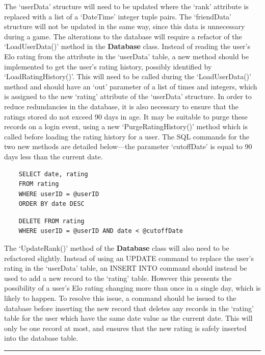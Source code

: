 \documentclass{article}
\begin{document}
 The `userData' structure will need to be updated where the `rank' attribute is replaced with a list of a `DateTime' integer tuple pairs. The `friendData' structure will not be updated in the same way, since this data is unnecessary during a game. The alterations to the database will require a refactor of the `LoadUserData()' method in the \textbf{Database} class. Instead of reading the user's Elo rating from the attribute in the `userData' table, a new method should be implemented to get the user's rating history, possibly identified by `LoadRatingHistory()'. This will need to be called during the `LoadUserData()' method and should have an `out' parameter of a list of times and integers, which is assigned to the new `rating' attribute of the `userData' structure. In order to reduce redundancies in the database, it is also necessary to ensure that the ratings stored do not exceed 90 days in age. It may be suitable to purge these records on a login event, using a new `PurgeRatingHistory()' method which is called before loading the rating history for a user. The SQL commands for the two new methods are detailed below---the parameter `cutoffDate' is equal to 90 days less than the current date.

 \begin{verbatim}
	SELECT date, rating
	FROM rating
	WHERE userID = @userID
	ORDER BY date DESC
 \end{verbatim}
 \begin{verbatim}
	DELETE FROM rating
	WHERE userID = @userID AND date < @cutoffDate
 \end{verbatim}

The `UpdateRank()' method of the \textbf{Database} class will also need to be refactored slightly. Instead of using an UPDATE command to replace the user's rating in the `userData' table, an INSERT INTO command should instead be used to add a new record to the `rating' table. However this presents the possibility of a user's Elo rating changing more than once in a single day, which is likely to happen. To resolve this issue, a command should be issued to the database before inserting the new record that deletes any records in the `rating' table for the user which have the same date value as the current date. This will only be one record at most, and ensures that the new rating is safely inserted into the database table.

\begin{center}
\rule{0.5\linewidth}{0.4pt}
\end{center}
\end{document}
